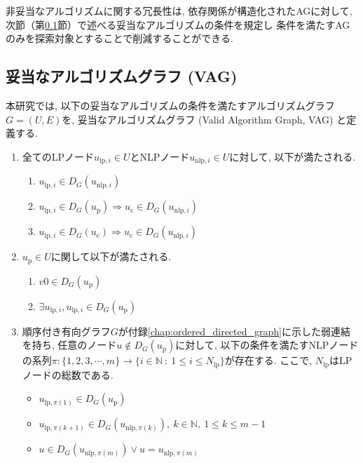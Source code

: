 \documentclass[11pt,oneside,openany,report]{jsbook}
\begin{document}
非妥当なアルゴリズムに関する冗長性は, 依存関係が構造化されたAGに対して, 次節（第\ref{subsec:proposed:ag:vag}節）で述べる妥当なアルゴリズムの条件を規定し 条件を満たすAGのみを探索対象とすることで削減することができる.

\subsection{妥当なアルゴリズムグラフ (VAG)}\label{subsec:proposed:ag:vag}
本研究では, 以下の妥当なアルゴリズムの条件を満たすアルゴリズムグラフ$G = (U, E)$を, 妥当なアルゴリズムグラフ (Valid Algorithm Graph, VAG) と定義する.

\begin{enumerate}
  \item 全てのLPノード$u_{\mathrm{lp}, i} \in U$とNLPノード$u_{\mathrm{nlp}, i}\in U$に対して, 以下が満たされる.
  \begin{enumerate}
    \item $ u_{\mathrm{lp}, i}\in D_G(u_{\mathrm{nlp}, i})$
    \item $ u_{\mathrm{lp}, i} \in D_G(u_\mathrm{p}) \Rightarrow u_\mathrm{c} \in D_G(u_{\mathrm{nlp}, i}) $
    \item $ u_{\mathrm{lp}, i} \in D_G(u_\mathrm{c}) \Rightarrow u_\mathrm{c} \in D_G(u_{\mathrm{nlp}, i}) $
  \end{enumerate}
  \item $u_\mathrm{p} \in U$に関して以下が満たされる.
  \begin{enumerate}
    \item $v0 \in D_G(u_\mathrm{p})$
    \item $ \exists u_{\mathrm{lp}, i}, u_{\mathrm{lp}, i} \in D_G(u_\mathrm{p}) $
  \end{enumerate}
  \item 順序付き有向グラフ$G$が付録\ref{chap:ordered_directed_graph}に示した弱連結を持ち, 任意のノード$u \not\in D_G(u_\mathrm{p})$に対して, 以下の条件を満たすNLPノードの系列$ \pi: \{ 1,2,3,\cdots, m \}\rightarrow \{ i \in \mathbb{N} \ :\ 1 \leq i \leq N_\mathrm{lp}\} $が存在する. ここで, $N_\mathrm{lp}$はLPノードの総数である.
  \begin{itemize}
    \item $ u_{\mathrm{lp}, \pi(1)} \in D_G(u_\mathrm{p}) $
    \item $ u_{\mathrm{lp}, \pi(k+1)} \in D_G(u_{\mathrm{nlp}, \pi(k)}),\ k \in \mathbb{N},\ 1 \leq k \leq m - 1  $
    \item $ u \in D_G(u_{\mathrm{nlp}, \pi(m)}) \lor u = u_{\mathrm{nlp}, \pi(m)} $
  \end{itemize}
\end{enumerate}
\end{document}
